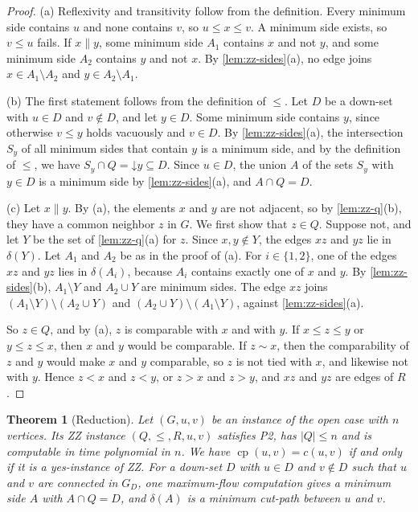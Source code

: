 \documentclass[pdflatex,sn-mathphys-num]{sn-jnl}%
\theoremstyle{thmstyleone}%
\newtheorem{theorem}{Theorem}%
\theoremstyle{thmstyletwo}%
\theoremstyle{thmstylethree}%
\newcommand{\cp}{\operatorname{cp}}%
\newcommand{\dn}{\mathord{\downarrow}}%
\begin{document}
\begin{proof}
(a) Reflexivity and transitivity follow from the definition.
Every minimum side contains $u$ and none contains $v$, so $u \leq x \leq v$.
A minimum side exists, so $v \leq u$ fails.
If $x \parallel y$, some minimum side $A_1$ contains $x$ and not $y$, and some minimum side $A_2$ contains $y$ and not $x$.
By \cref{lem:zz-sides}(a), no edge joins $x \in A_1 \setminus A_2$ and $y \in A_2 \setminus A_1$.

(b) The first statement follows from the definition of $\leq$.
Let $D$ be a down-set with $u \in D$ and $v \notin D$, and let $y \in D$.
Some minimum side contains $y$, since otherwise $v \leq y$ holds vacuously and $v \in D$.
By \cref{lem:zz-sides}(a), the intersection $S_y$ of all minimum sides that contain $y$ is a minimum side, and by the definition of $\leq$, we have $S_y \cap Q = \dn y \subseteq D$.
Since $u \in D$, the union $A$ of the sets $S_y$ with $y \in D$ is a minimum side by \cref{lem:zz-sides}(a), and $A \cap Q = D$.

(c) Let $x \parallel y$.
By (a), the elements $x$ and $y$ are not adjacent, so by \cref{lem:zz-q}(b), they have a common neighbor $z$ in $G$.
We first show that $z \in Q$.
Suppose not, and let $Y$ be the set of \cref{lem:zz-q}(a) for $z$.
Since $x, y \notin Y$, the edges $xz$ and $yz$ lie in $\delta(Y)$.
Let $A_1$ and $A_2$ be as in the proof of (a).
For $i \in \{1, 2\}$, one of the edges $xz$ and $yz$ lies in $\delta(A_i)$, because $A_i$ contains exactly one of $x$ and $y$.
By \cref{lem:zz-sides}(b), $A_1 \setminus Y$ and $A_2 \cup Y$ are minimum sides.
The edge $xz$ joins $(A_1 \setminus Y) \setminus (A_2 \cup Y)$ and $(A_2 \cup Y) \setminus (A_1 \setminus Y)$, against \cref{lem:zz-sides}(a).

So $z \in Q$, and by (a), $z$ is comparable with $x$ and with $y$.
If $x \leq z \leq y$ or $y \leq z \leq x$, then $x$ and $y$ would be comparable.
If $z \sim x$, then the comparability of $z$ and $y$ would make $x$ and $y$ comparable, so $z$ is not tied with $x$, and likewise not with $y$.
Hence $z < x$ and $z < y$, or $z > x$ and $z > y$, and $xz$ and $yz$ are edges of $R$.
\end{proof}

\begin{theorem}[Reduction]
\label{thm:zz-reduction}
Let $(G, u, v)$ be an instance of the open case with $n$ vertices.
Its ZZ instance $(Q, \leq, R, u, v)$ satisfies P2, has $|Q| \leq n$ and is computable in time polynomial in $n$.
We have $\cp(u, v) = c(u, v)$ if and only if it is a yes-instance of ZZ.
For a down-set $D$ with $u \in D$ and $v \notin D$ such that $u$ and $v$ are connected in $G_D$, one maximum-flow computation gives a minimum side $A$ with $A \cap Q = D$, and $\delta(A)$ is a minimum cut-path between $u$ and $v$.
\end{theorem}
\end{document}
